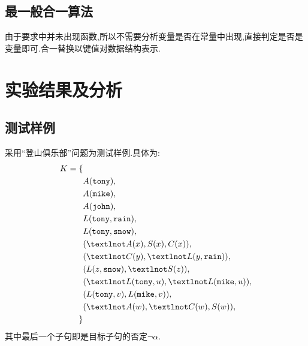     \subsection{最一般合一算法}
    由于要求中并未出现函数,所以不需要分析变量是否在常量中出现,直接判定是否是变量即可.合一替换以键值对数据结构表示.
    \section{实验结果及分析}
    \subsection{测试样例}
    采用``登山俱乐部''问题为测试样例.具体为:
    \begin{align*}
        K = \{& \\
        &A(\code{tony}), \\
        &A(\code{mike}), \\
        &A(\code{john}), \\
        &L(\code{tony}, \code{rain}), \\
        &L(\code{tony}, \code{snow}),\\
        &(¬A(x), S(x), C(x)),\\
        &(¬C(y), ¬L(y, \code{rain})),\\
        &(L(z, \code{snow}), ¬S(z)),\\
        &(¬L(\code{tony}, u), ¬L(\code{mike}, u)),\\
        &(L(\code{tony}, v), L(\code{mike}, v)),\\
        &(¬A(w), ¬C(w), S(w)),\\
        \}& 
    \end{align*}
    其中最后一个子句即是目标子句的否定\(\neg \alpha\).
